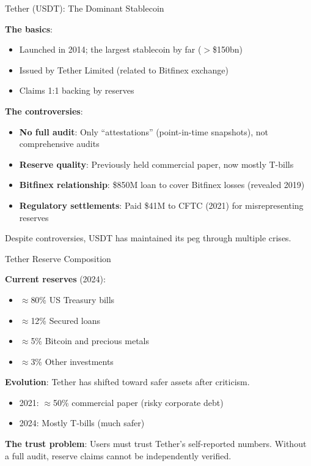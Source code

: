 \documentclass[10pt]{beamer}
\begin{document}
\begin{frame}{Tether (USDT): The Dominant Stablecoin}
  
  \textbf{The basics}:
  \begin{itemize}
    \item Launched in 2014; the largest stablecoin by far ($>$\$150bn)
    \item Issued by Tether Limited (related to Bitfinex exchange)
    \item Claims 1:1 backing by reserves
  \end{itemize}
  
  \vspace{1em}
  \textbf{The controversies}:
  \begin{itemize}
    \item \textbf{No full audit}: Only ``attestations'' (point-in-time snapshots), not comprehensive audits
    \item \textbf{Reserve quality}: Previously held commercial paper, now mostly T-bills
    \item \textbf{Bitfinex relationship}: \$850M loan to cover Bitfinex losses (revealed 2019)
    \item \textbf{Regulatory settlements}: Paid \$41M to CFTC (2021) for misrepresenting reserves
  \end{itemize}
  
  \vspace{0.5em}
  Despite controversies, USDT has maintained its peg through multiple crises.
\end{frame}

\begin{frame}{Tether Reserve Composition}
  
  \textbf{Current reserves} (2024):
  \begin{itemize}
    \item $\approx$80\% US Treasury bills
    \item $\approx$12\% Secured loans
    \item $\approx$5\% Bitcoin and precious metals
    \item $\approx$3\% Other investments
  \end{itemize}
  
  \vspace{1em}
  \textbf{Evolution}: Tether has shifted toward safer assets after criticism.
  \begin{itemize}
    \item 2021: $\approx$50\% commercial paper (risky corporate debt)
    \item 2024: Mostly T-bills (much safer)
  \end{itemize}
  
  \vspace{0.5em}
  \textbf{The trust problem}: Users must trust Tether's self-reported numbers. Without a full audit, reserve claims cannot be independently verified.
\end{frame}
\end{document}
